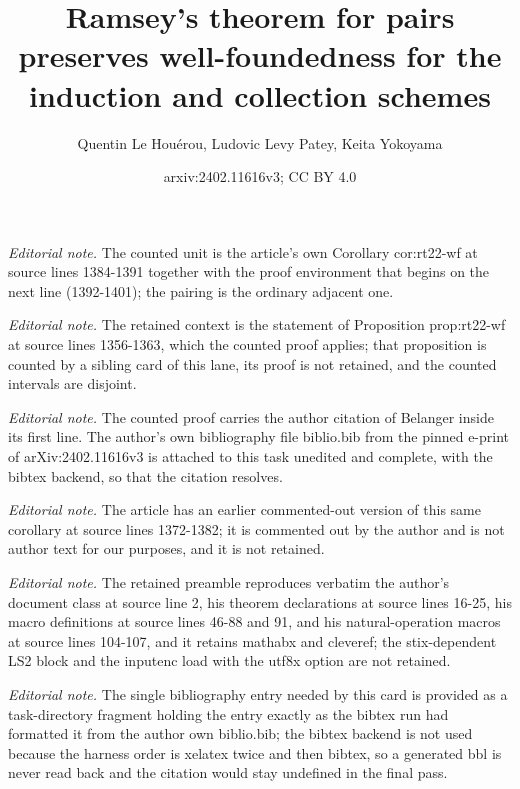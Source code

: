 \documentclass{article}
\title{Ramsey's theorem for pairs preserves well-foundedness for the induction and collection schemes}
\author{Quentin Le Houérou, Ludovic Levy Patey, Keita Yokoyama}
\date{arxiv:2402.11616v3; CC BY 4.0}
\numberwithin{theorem}{section}
\begin{document}
\maketitle
\noindent\textit{Editorial note.} The counted unit is the article's own Corollary cor:rt22-wf at source lines 1384-1391 together with the proof environment that begins on the next line (1392-1401); the pairing is the ordinary adjacent one.\par\medskip
\noindent\textit{Editorial note.} The retained context is the statement of Proposition prop:rt22-wf at source lines 1356-1363, which the counted proof applies; that proposition is counted by a sibling card of this lane, its proof is not retained, and the counted intervals are disjoint.\par\medskip
\noindent\textit{Editorial note.} The counted proof carries the author citation of Belanger inside its first line. The author's own bibliography file biblio.bib from the pinned e-print of arXiv:2402.11616v3 is attached to this task unedited and complete, with the bibtex backend, so that the citation resolves.\par\medskip
\noindent\textit{Editorial note.} The article has an earlier commented-out version of this same corollary at source lines 1372-1382; it is commented out by the author and is not author text for our purposes, and it is not retained.\par\medskip
\noindent\textit{Editorial note.} The retained preamble reproduces verbatim the author's document class at source line 2, his theorem declarations at source lines 16-25, his macro definitions at source lines 46-88 and 91, and his natural-operation macros at source lines 104-107, and it retains mathabx and cleveref; the stix-dependent LS2 block and the inputenc load with the utf8x option are not retained.\par\medskip
\noindent\textit{Editorial note.} The single bibliography entry needed by this card is provided as a task-directory fragment holding the entry exactly as the bibtex run had formatted it from the author own biblio.bib; the bibtex backend is not used because the harness order is xelatex twice and then bibtex, so a generated bbl is never read back and the citation would stay undefined in the final pass.\par\medskip
\end{document}
